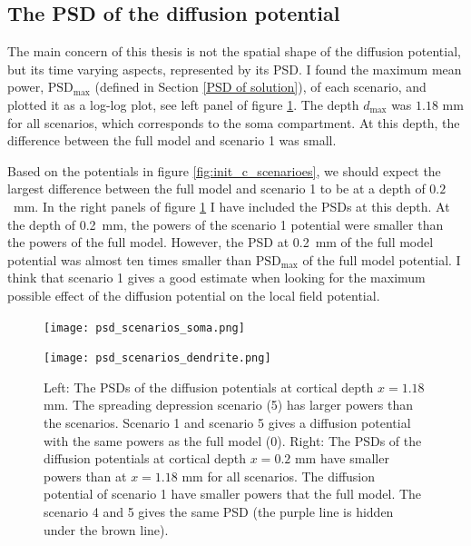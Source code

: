 \documentclass{uiophd}
\begin{document}
\subsection{The PSD of the diffusion potential}
The main concern of this thesis is not the spatial shape of the diffusion potential, but its time varying aspects, represented by its PSD. I found the maximum mean power, $\text{PSD}_{\text{max}}$ (defined in Section \ref{PSD of solution}), of each scenario, and plotted it as a log-log plot, see left panel of figure \ref{fig:psd_scenarios}. The depth $d_{\text{max}}$ was $1.18$ mm for all scenarios, which corresponds to the soma compartment. At this depth, the difference between the full model and scenario 1 was small.

Based on the potentials in figure \ref{fig:init_c_scenarioes}, we should expect the largest difference between the full model and scenario 1 to be at a depth of $0.2$~mm. In the right panels of figure \ref{fig:psd_scenarios} I have included the PSDs at this depth. At the depth of 0.2~mm, the powers of the scenario 1 potential were smaller than the powers of the full model. However, the PSD at 0.2~mm of the full model potential was  almost ten times smaller than $\text{PSD}_{\text{max}}$ of the full model potential. I think that scenario 1 gives a good estimate when looking for the maximum possible effect of the diffusion potential on the local field potential.

\begin{figure}[!tbp]
  \centering
  \begin{minipage}[b]{0.475\textwidth}
    \texttt{[image: psd\_scenarios\_soma.png]}
  \end{minipage}
  \hfill
  \begin{minipage}[b]{0.475\textwidth}
    \texttt{[image: psd\_scenarios\_dendrite.png]}
  \end{minipage}
  \caption{Left: The PSDs of the diffusion potentials at cortical depth $x=1.18$ mm. The spreading depression scenario (5) has larger powers than the scenarios. Scenario 1 and scenario 5 gives a diffusion potential with the same powers as the full model (0). 
  Right: The PSDs of the diffusion potentials at cortical depth $x=0.2$ mm have smaller powers than at $x=1.18$ mm for all scenarios. The diffusion potential of scenario 1 have smaller powers that the full model. The scenario 4 and 5 gives the same PSD (the purple line is hidden under the brown line). }
  \label{fig:psd_scenarios}
\end{figure} 
\end{document}
